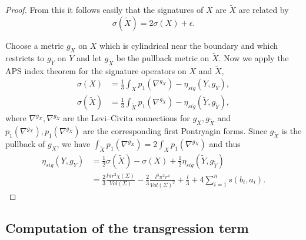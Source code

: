 \documentclass{amsart}
\theoremstyle{definition}
\theoremstyle{remark}
\numberwithin{equation}{section}
\begin{document}
\begin{proof}
From this it follows easily that the signatures of $X$ are $\widetilde{X}$ are related by
\[
\sigma(\widetilde{X}) = 2 \sigma(X) + \epsilon.
\]

Choose a metric $g_X$ on $X$ which is cylindrical near the boundary and which restricts to $g_Y$ on $Y$ and let $g_{\widetilde{X}}$ be the pullback metric on $\widetilde{X}$. Now we apply the APS index theorem for the signature operators on $X$ and $\widetilde{X}$,
\begin{align*}
\sigma(X) &= \frac{1}{3} \int_X p_1( \nabla^{g_X} ) - \eta_{sig}(Y , g_Y), \\
\sigma(\widetilde{X}) &= \frac{1}{3} \int_{\widetilde{X}} p_1( \nabla^{g_{\widetilde{X}}}) - \eta_{sig}(\widetilde{Y} , g_{\widetilde{Y}}),
\end{align*}
where $\nabla^{g_X}, \nabla^{g_{\widetilde{X}}}$ are the Levi--Civita connections for $g_X , g_{\widetilde{X}}$ and $p_1(\nabla^{g_X}), p_1( \nabla^{g_{\widetilde{X}}})$ are the corresponding first Pontryagin forms. Since $g_{\widetilde{X}}$ is the pullback of $g_X$, we have $\int_{\widetilde{X}} p_1( \nabla^{g_{\widetilde{X}}} ) = 2 \int_X p_1( \nabla^{g_X})$ and thus
\begin{align*}
\eta_{sig}(Y , g_Y) &= \frac{1}{2}\sigma(\widetilde{X}) - \sigma(X) + \frac{1}{2} \eta_{sig}(\widetilde{Y} , g_{\widetilde{Y}}) \\
&= \frac{2}{3} \frac{ l \pi r^2 \chi(\Sigma) }{Vol(\Sigma)} - \frac{2}{3} \frac{ l^3 \pi^2 r^4}{Vol(\Sigma)^2} + \frac{l}{3} + 4 \sum_{i=1}^{n} s(b_i,a_i).
\end{align*}

\end{proof}


\subsection{Computation of the transgression term}\label{sec:transgr}
\end{document}
